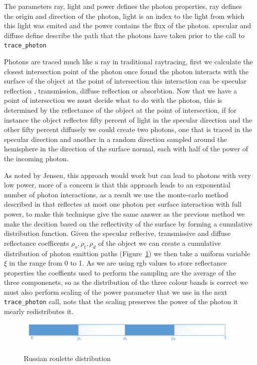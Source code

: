 The parameters ray, light and power defines the photon properties, ray defines the origin and direction of the photon, light is an index
to the light from which this light was emited and the power contains the flux of the photon. specular and diffuse
define describe the path that the photons have taken prior to the call to \texttt{trace\_photon}

Photons are traced much like a ray in traditional raytracing, first we calculate the closest intersection point of the photon
once found the photon interacts with the surface of the object at the point of intersection this interaction can be specular 
reflection , transmission, diffuse reflection or absorbtion. Now that we have a point of intersection we must decide what
to do with the photon, this is determined by the reflectance of the object at the point of intersection, if for instance the
object reflectes fifty percent of light in the specular direction and the other fifty percent diffusely we could create two
photons, one that is traced in the specular direction and another in a random direction sampled around the hemisphere in the
direction of the surface normal, each with half of the power of the incoming photon.

As noted by Jensen, this approach would work but can lead to photons with very low power, more of a concern is that this approach leads to an exponential number of
photon interactions, as a result we use the monte-carlo method described in  that reflectes at most one photon
per surface interaction with full power, to make this technique give the same answer as the previous method we make the
decition based on the reflectivity of the surface by forming a cumulative distribution function.  
Given the specular reflecive, transmissive and diffuse reflectance coefficents $\rho_{s}, \rho_{t}, \rho_{d}$
of the object we can create a cumulative distribution of photon emittion paths (Figure~\ref{fig:rr_dist}) 
we then take a uniform variable $\xi$ in the range from 0 to 1. As we are using rgb values to store reflectance properties the
coeffients used to perform the sampling are the average of the three componenets, so as the distribution of the three
colour bands is correct we must also perform scaling of the power parameter that we use in the next \texttt{trace\_photon}
call, note that the scaling preserves the power of the photon it mearly redistributes it.

\begin{figure}[h]
\includegraphics{./images/russian_roulette_distribution.png}
\label{fig:rr_dist}
\caption{Russian roulette distribution}
\end{figure}


